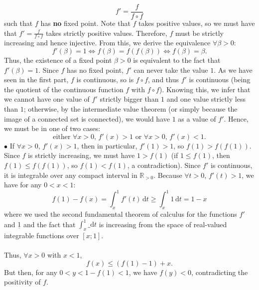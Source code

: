 \begin{solution}
    \[
        f' = \frac{f}{f \circ f}
    \]
    such that \( f \) has \textbf{no} fixed point. Note that \( f \) takes positive values, so we must have that \( f' = \frac{f}{f \circ f} \) takes strictly positive values. Therefore, \( f \) must be strictly increasing and hence injective. From this, we derive the equivalence \( \forall \beta>0 \):
    \[
        f'\left(\beta\right) = 1 \Leftrightarrow f\left(\beta\right) = f\left(f\left(\beta\right)\right) \Leftrightarrow f\left(\beta\right) = \beta.
    \]
    Thus, the existence of a fixed point \( \beta>0 \) is equivalent to the fact that \( f'\left(\beta\right) = 1 \). Since \( f \) has no fixed point, \( f' \) can never take the value \( 1 \). As we have seen in the first part, \( f \) is continuous, so is \( f \circ f \), and thus \( f' \) is continuous (being the quotient of the continuous function \( f \) with \( f \circ f \)). Knowing this, we infer that we cannot have one value of \( f' \) strictly bigger than \( 1 \) and one value strictly less than \( 1 \); otherwise, by the intermediate value theorem (or simply because the image of a connected set is connected), we would have \( 1 \) as a value of \( f' \). Hence, we must be in one of two cases:
    \[
        \text{either }\forall x>0,\, f'\left(x\right) > 1\text{ or }\forall x>0,\,f'\left(x\right) < 1.
    \]
    \( \bullet \) If \( \forall x>0 \), \( f'\left(x\right) > 1 \), then in particular, \( f'\left(1\right) > 1 \), so \( f\left(1\right) > f\left(f\left(1\right)\right) \). Since \( f \) is strictly increasing, we must have \( 1 > f\left(1\right) \) (if \( 1 \leq f\left(1\right) \), then \( f\left(1\right) \leq f\left(f\left(1\right)\right) \), so \( f\left(1\right) < f\left(1\right) \), a contradiction). Since \( f' \) is continuous, it is integrable over any compact interval in \( \mathbb{R}_{>0} \). Because \( \forall t>0 \), \( f'\left(t\right) > 1 \), we have for any \( 0 < x < 1 \):
    \[
        f\left(1\right) - f\left(x\right) = \int_{x}^{1} f'\left(t\right) \, \mathrm{d}t \geq \int_{x}^{1} 1 \, \mathrm{d}t = 1 - x
    \]
    where we used the second fundamental theorem of calculus for the functions \( f' \) and \( \underline{1} \) and the fact that \( \int_{x}^{1} \_ \mathrm{d}t \) is increasing from the space of real-valued integrable functions over \( \left[x;1\right] \).
    \\\\
    Thus, \( \forall x>0 \) with \( x<1 \),
    \[
        f\left(x\right) \leq \left(f\left(1\right) - 1\right) + x.
    \]
    But then, for any \( 0 < y < 1 - f\left(1\right)<1 \), we have \( f\left(y\right) < 0 \), contradicting the positivity of \( f \).

\end{solution}
